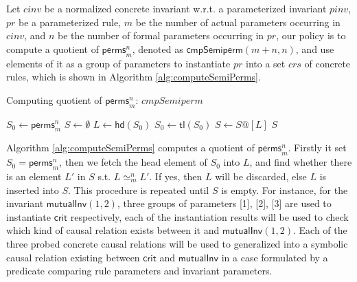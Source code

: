 \documentclass[final]{IEEEtran}
\begin{document}
{%
Let $cinv$  be a normalized concrete invariant w.r.t. a parameterized invariant $pinv$, $pr$ be a parameterized rule, $m$ be the number of actual parameters occurring in $cinv$, and $n$  be the number of formal parameters occurring in $pr$,  our policy is to compute a quotient of $\mathsf{perms}_{m}^{n}$, denoted as $\mathsf{cmpSemiperm}(m+n,n )$, and use elements of it as a group of parameters to instantiate $pr$ into a set $crs$ of concrete rules, which is shown in Algorithm \ref{alg:computeSemiPerms}.%
\begin{algorithm}
\caption{Computing quotient of $\mathsf{perms}_{m}^{n}$: $cmpSemiperm$ \label{alg:computeSemiPerms}}%



{
    $S_0\leftarrow \mathsf{perms}_m^n$\;
     $S\leftarrow \emptyset $\;
      {$L \leftarrow \mathsf{hd}(S_0)$\;
       $S_0 \leftarrow \mathsf{tl}(S_0)$\;
        { $S\leftarrow S@[L]$\;}
      }
    \Return $S$\;
}


\end{algorithm}

Algorithm \ref{alg:computeSemiPerms} computes a quotient of $\mathsf{perms}_{m}^{n}$.   Firstly it set $S_0=\mathsf{perms}_m^n$,  then we fetch the head element of $S_0$ into $L$, and find whether there is an element $L'$ in $S$ s.t. $L\simeq_m^n L'$. If  yes, then $L$ will be discarded, else $L$ is inserted into $S$. This procedure is repeated until $S$ is empty.
For instance, for the invariant $\mathsf{mutualInv}(1,2)$, three groups of parameters [1], [2], [3] are used to instantiate $\mathsf{crit}$ respectively, each of the instantiation results will be used to check which kind of  causal relation exists between it and $\mathsf{mutualInv}(1,2)$.  Each of the three probed concrete causal relations will be used to generalized  into a symbolic causal relation existing between $\mathsf{crit}$ and $\mathsf{mutualInv}$ in a case formulated by a predicate comparing rule parameters and invariant parameters.  %

}
\end{document}
